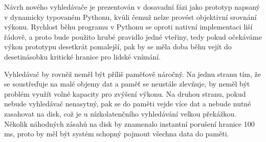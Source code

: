 \documentclass[11pt,letterpaper,oneside,openright]{book}
\begin{document}
Návrh nového vyhledávače je prezentován v dosavadní fázi jako prototyp napsaný
v dynamicky typovaném Pythonu, kvůli čemuž nelze provést objektivní srovnání
výkonu. Rychlost běhu programu v Pythonu se oproti nativní implementaci liší
řádově, a proto bude použito hrubé pravidlo jedné vteřiny, tedy pokud očekáváme
výkon prototypu desetkrát pomalejší, pak by se měla doba běhu vejít do
desetinásobku kritické hranice pro lidské vnímání.

Vyhledávač by rovněž neměl být příliš paměťově náročný. Na jednu stranu tím, že
se soustřeďuje na malé objemy dat a paměť se neustále zlevňuje, by neměl být
problém využít volné kapacity pro zvýšení výkonu. Na druhou stranu, pokud
nebude vyhledávač nenasytný, pak se do paměti vejde více dat a nebude nutné
zasahovat na disk, což je u nízkolatenčního vyhledávání velkou překážkou.
Několik náhodných zásahů na disk by znamenalo instantní porušení hranice
100\,ms, proto by měl být systém schopný pojmout všechna data do paměti.
\end{document}
